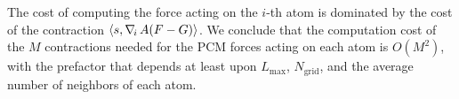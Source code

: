 The cost of computing the force acting on the $i$-th atom is dominated by the cost of the contraction $\langle s , \nabla_{\!i}\,  A ( F - G ) \rangle$. We conclude that the computation cost of the $M$ contractions needed for the PCM forces acting on each atom is $O(M^2)$, with the prefactor that depends at least upon $L_\text{max}$, $N_\text{grid}$, and the average number of neighbors of each atom.


%
